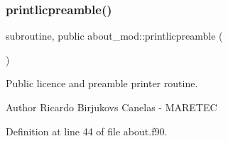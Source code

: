 \subsubsection{\texorpdfstring{printlicpreamble()}{printlicpreamble()}}
{\footnotesize\ttfamily subroutine, public about\+\_\+mod\+::printlicpreamble (\begin{DoxyParamCaption}{ }\end{DoxyParamCaption})}



Public licence and preamble printer routine. 

\begin{DoxyAuthor}{Author}
Ricardo Birjukovs Canelas -\/ M\+A\+R\+E\+T\+EC 
\end{DoxyAuthor}


Definition at line 44 of file about.\+f90.


